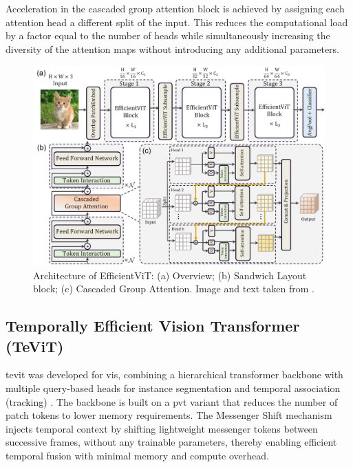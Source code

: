 Acceleration in the cascaded group attention block is achieved by assigning each attention head a different split of the input. This reduces the computational load by a factor equal to the number of heads while simultaneously increasing the diversity of the attention maps without introducing any additional parameters. 
\begin{figure}[H]
	\centering
	\includegraphics[width=1.0\textwidth]{./images/EfficientViT_architecture.pdf}
	\caption[Architecture of EfficientViT]{Architecture of EfficientViT: (a) Overview; (b) Sandwich Layout block; (c) Cascaded Group Attention. Image and text taken from \cite{liu2023efficientvitmemoryefficientvision}.}
	\label{Architecture_of_EfficientViT}
\end{figure}



\subsection{Temporally Efficient Vision Transformer (TeViT)}
\gls{tevit} was developed for \gls{vis}, combining a hierarchical transformer backbone with multiple query‑based heads for instance segmentation and temporal association (tracking) \cite{yang2022temporallyefficientvisiontransformer}. The backbone is built on a \gls{pvt} variant that reduces the number of patch tokens to lower memory requirements. The Messenger Shift mechanism injects temporal context by shifting lightweight messenger tokens between successive frames, without any trainable parameters, thereby enabling efficient temporal fusion with minimal memory and compute overhead.

\medskip

